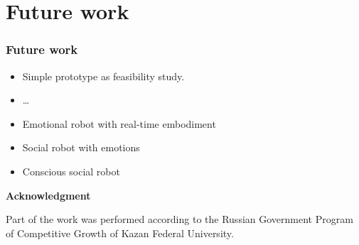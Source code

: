 \documentclass[12pt, aspectratio=169]{beamer}
\begin{document}
\section{Future work}
\begin{frame}
  \frametitle{Future work}
  
\begin{itemize}
  \item Simple prototype as feasibility study.
  \item \ldots\
  \item Emotional robot with real-time embodiment
  \item Social robot with emotions
  \item Conscious social robot
\end{itemize}

\textbf{Acknowledgment}

Part of the work was performed according to the Russian Government Program of Competitive Growth of Kazan Federal University.

\end{frame}



\end{document}
